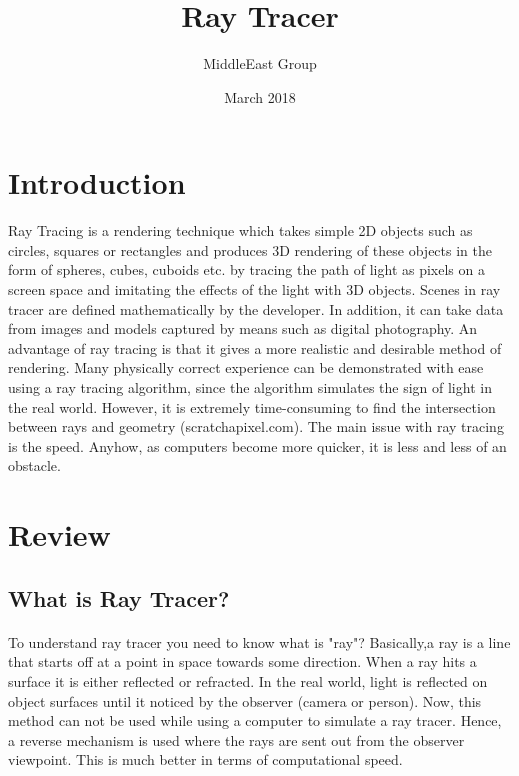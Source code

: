 \documentclass{article}
\title{Ray Tracer}
\author{MiddleEast Group }
\date{March 2018}
\begin{document}
\maketitle 

\section{Introduction}

Ray Tracing is a rendering technique which takes simple 2D objects such as circles, squares or rectangles and
produces 3D rendering of these objects in the form of spheres, cubes, cuboids etc.  by tracing the path of light as pixels on a screen space and imitating the effects of the light  with 3D objects. Scenes in ray tracer are defined mathematically by the developer. In addition, it can take data from images and models captured by means such as digital photography. \newline An advantage of ray tracing is that it gives a more realistic and desirable method of rendering. Many physically correct experience can be demonstrated with ease using a ray tracing algorithm, since the algorithm simulates the sign of light in the real world.
However, it is extremely time-consuming to find the intersection between rays and geometry (scratchapixel.com). The main issue with ray tracing is the speed. Anyhow, as computers become more quicker, it is less and less of an obstacle. 

\section{Review}
\subsection{What is Ray Tracer?}

\paragraph{}

To understand ray tracer you need to know what is "ray"? Basically,a ray is a line that starts off at a point in space towards some direction. When a ray hits a surface it is either reflected or refracted.
In the real world, light is reflected on object surfaces until it noticed by the observer (camera or person). \newline Now, this method can not be used while using a computer to simulate a ray tracer. Hence, a reverse mechanism is used where the rays are sent out from the observer viewpoint. This is much better in terms of computational speed. 
\end{document}

